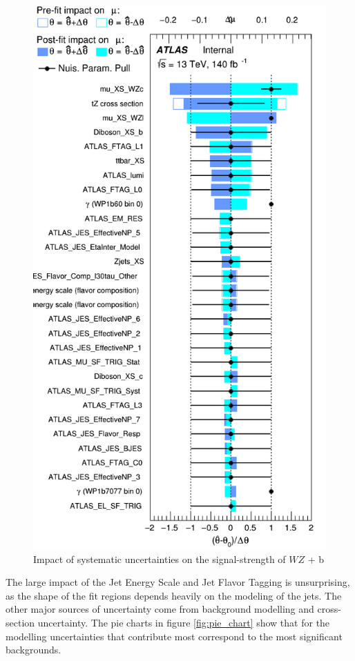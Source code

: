 \documentclass[NOTE, atlasdraft=true, texlive=2016, UKenglish]{\ATLASLATEXPATH atlasdoc}
\begin{document}
\begin{figure}[H]
    \centering
    \includegraphics[width=0.7\linewidth]{all_b/Ranking.png}
    \caption{Impact of systematic uncertainties on the signal-strength of $WZ$ + b}
    \label{fig:ranking}
\end{figure}

The large impact of the Jet Energy Scale and Jet Flavor Tagging is unsurprising, as the shape of the fit regions depends heavily on the modeling of the jets. The other major sources of uncertainty come from background modelling and cross-section uncertainty. The pie charts in figure \ref{fig:pie_chart} show that for the modelling uncertainties that contribute most correspond to the most significant backgrounds. %
\end{document}

